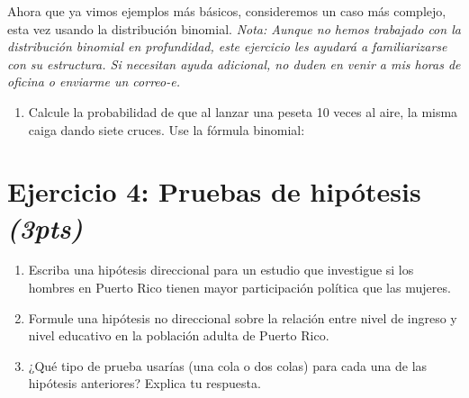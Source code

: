 \documentclass[11pt]{article}
\begin{document}
Ahora que ya vimos ejemplos más básicos, consideremos un caso más complejo, esta vez usando la distribución binomial. \textit{Nota: Aunque no hemos trabajado con la distribución binomial en profundidad, este ejercicio les ayudará a familiarizarse con su estructura. Si necesitan ayuda adicional, no duden en venir a mis horas de oficina o enviarme un correo-e.}

\begin{enumerate}
\item[3.] Calcule la probabilidad de que al lanzar una peseta 10 veces al aire, la misma caiga dando siete cruces. Use la fórmula binomial:
\end{enumerate}
\vspace{3cm} %

\section*{Ejercicio 4: Pruebas de hipótesis \textit{(3pts)}} 
\begin{enumerate}
    \item Escriba una hipótesis direccional para un estudio que investigue si los hombres en Puerto Rico tienen mayor participación política que las mujeres.
    \item Formule una hipótesis no direccional sobre la relación entre nivel de ingreso y nivel educativo en la población adulta de Puerto Rico.

    \item ¿Qué tipo de prueba usarías (una cola o dos colas) para cada una de las hipótesis anteriores? Explica tu respuesta.

\end{enumerate}
\end{document}
